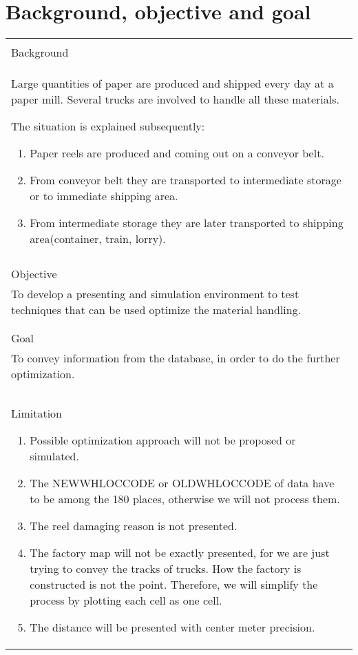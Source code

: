 \documentclass{article}
\begin{document}
\section{Background, objective and goal}
\begin{table}[h]
    \begin{tabular}{| p{14.5cm} |}
	\hline \\ [0.5ex]
	Background \\ [1ex]
	Large quantities of paper are produced and shipped every day at a paper mill. Several trucks are involved to handle all these materials.

	The situation is explained subsequently:
	\begin{enumerate}
	    \item
		Paper reels are produced and coming out on a conveyor belt.
	    \item
		From conveyor belt they are transported to intermediate storage or to immediate shipping area.
	    \item
		From intermediate storage they are later transported to shipping area(container, train, lorry).
	\end{enumerate}
	\\ [-2ex] \hline \\ [-2ex]

	Objective \\ [1ex]
	To develop a presenting and simulation environment to test techniques that can be used optimize the material handling. \\
	\\ [-2ex] \hline \\ [-2ex]

	Goal \\ [1ex]
	To convey information from the database, in order to do the further optimization.\\
	\\ [-2ex] \hline \\ [-2ex]

	Limitation
	\begin{enumerate}
	    \item
		Possible optimization approach will not be proposed or simulated.
	    \item
		The NEWWHLOCCODE or OLDWHLOCCODE of data have to be among the 180 places, otherwise we will not process them.
	    \item
		The reel damaging reason is not presented.
	    \item
		The factory map will not be exactly presented, for we are just trying to convey the tracks of trucks. How the factory is constructed is not
		the point. Therefore, we will simplify the process by plotting each cell as one cell.
	    \item
		The distance will be presented with center meter precision.
	\end{enumerate} \\ \hline

    \end{tabular}
\end{table}
\newpage
\end{document}
